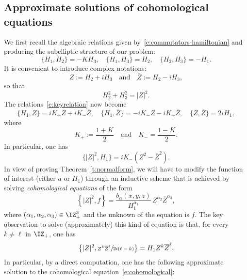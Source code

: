 \documentclass[JEP,XML,SOM,Unicode, NoEqCountersInSection,published]{cedram}
\theoremstyle{plain}
\theoremstyle{definition}
\theoremstyle{remark}
\begin{document}
\subsection{Approximate solutions of cohomological equations}

We first recall the alge\-braic relations given by~\eqref{e:commutators-hamiltonian} and producing the subelliptic structure of our problem:
\begin{equation}\label{e:keyrelation}
\{H_1,H_{2}\}=-KH_3,\quad \{H_1, H_3\}=H_{2},\quad\{H_2,H_3\}=-H_1.
\end{equation}
It is convenient to introduce complex notations:
\[
Z:=H_{2}+iH_3\quad\text{and}\quad \overline{Z}:=H_{2}-iH_3,
\]
so that
\[
H_{2}^2+H_3^2=|Z|^2.
\]
The relations~\eqref{e:keyrelation} now become
\begin{equation}%
\{H_1,Z\}=iK_+Z+iK_-\overline{Z},\quad \{H_1, \overline{Z}\}=-iK_-Z-iK_+\overline{Z},\quad\{Z,\overline{Z}\}=2iH_1,
\end{equation}
where
\[
K_+:=\frac{1+K}{2}\quad\text{and}\quad K_-=\frac{1-K}{2}.
\]
In particular, one has
\begin{equation}\label{e:H1commuteZ2}
\{|Z|^2,H_1\}=iK_-(Z^2-\overline{Z}^2).
\end{equation}
In view of proving Theorem~\ref{t:normalform}, we will have to modify the function of interest (either $a$ or $H_1$) through an inductive scheme that is achieved by solving \emph{cohomological equations} of the form
\begin{equation}\label{e:cohomological}
\left\{|Z|^2,f\right\}=\frac{b_\alpha(x,y,z)}{H_1^{\alpha_1}}\,Z^{\alpha_2}\overline{Z}^{\alpha_3},
\end{equation}
where $(\alpha_1,\alpha_2,\alpha_3)\in\IZ_+^3$ and the unknown of the equation is $f$. The key observation to solve (approximately) this kind of equation is that, for every $k\neq \ell$ in $\IZ_+$, one has
\begin{equation}\label{e:solution-cohomological-function}
\left\{|Z|^2, \sfrac{Z^k \overline{Z}^\ell}{2i(\ell-k)}\right\}=H_1 Z^k \overline{Z}^\ell.
\end{equation}
In particular, by a direct computation, one has the following approximate solution to the cohomological equation~\eqref{e:cohomological}:
\end{document}
